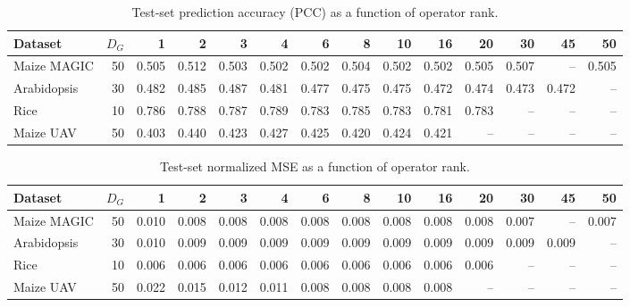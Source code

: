 
\begin{table}[ht]
\centering
\caption{Test-set prediction accuracy (PCC) as a function of operator rank.}
\label{tab:etable1a}
\small
\begin{tabular}{lrrrrrrrrrrrrr}
\toprule
Dataset & $D_G$ & 1 & 2 & 3 & 4 & 6 & 8 & 10 & 16 & 20 & 30 & 45 & 50 \\
\midrule
Maize MAGIC & 50 & 0.505 & 0.512 & 0.503 & 0.502 & 0.502 & 0.504 & 0.502 & 0.502 & 0.505 & 0.507 & -- & 0.505 \\
Arabidopsis & 30 & 0.482 & 0.485 & 0.487 & 0.481 & 0.477 & 0.475 & 0.475 & 0.472 & 0.474 & 0.473 & 0.472 & -- \\
Rice & 10 & 0.786 & 0.788 & 0.787 & 0.789 & 0.783 & 0.785 & 0.783 & 0.781 & 0.783 & -- & -- & -- \\
Maize UAV & 50 & 0.403 & 0.440 & 0.423 & 0.427 & 0.425 & 0.420 & 0.424 & 0.421 & -- & -- & -- & -- \\
\bottomrule
\end{tabular}
\end{table}

\begin{table}[ht]
\centering
\caption{Test-set normalized MSE as a function of operator rank.}
\label{tab:etable1b}
\small
\begin{tabular}{lrrrrrrrrrrrrr}
\toprule
Dataset & $D_G$ & 1 & 2 & 3 & 4 & 6 & 8 & 10 & 16 & 20 & 30 & 45 & 50 \\
\midrule
Maize MAGIC & 50 & 0.010 & 0.008 & 0.008 & 0.008 & 0.008 & 0.008 & 0.008 & 0.008 & 0.008 & 0.007 & -- & 0.007 \\
Arabidopsis & 30 & 0.010 & 0.009 & 0.009 & 0.009 & 0.009 & 0.009 & 0.009 & 0.009 & 0.009 & 0.009 & 0.009 & -- \\
Rice & 10 & 0.006 & 0.006 & 0.006 & 0.006 & 0.006 & 0.006 & 0.006 & 0.006 & 0.006 & -- & -- & -- \\
Maize UAV & 50 & 0.022 & 0.015 & 0.012 & 0.011 & 0.008 & 0.008 & 0.008 & 0.008 & -- & -- & -- & -- \\
\bottomrule
\end{tabular}
\end{table}
